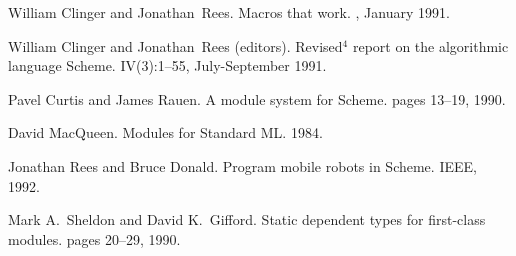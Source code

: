 %
%


\begin{thebibliography}{10}

William Clinger and Jonathan~Rees.
\newblock Macros that work.
, January 1991.

William Clinger and Jonathan~Rees (editors).
\newblock Revised${}^4$ report on the algorithmic language {S}cheme.
 IV(3):1--55, July-September 1991.

Pavel Curtis and James Rauen.
\newblock A module system for Scheme.
pages 13--19, 1990.

David MacQueen.
\newblock Modules for Standard ML.
1984.

Jonathan Rees and Bruce Donald.
\newblock Program mobile robots in Scheme.
 IEEE, 1992. 

Mark A.~Sheldon and David K.~Gifford.
\newblock Static dependent types for first-class modules.
pages 20--29, 1990.

\end{thebibliography}



